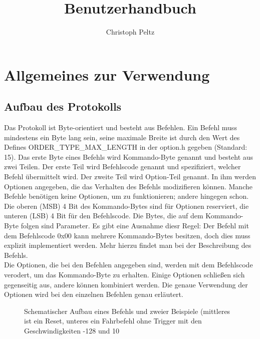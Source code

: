 \documentclass[a4paper]{article}
\title{Benutzerhandbuch}
\author{Christoph Peltz}
\begin{document}
\maketitle
\pagebreak
\tableofcontents
\pagebreak
	\section{Allgemeines zur Verwendung}


	\subsection{Aufbau des Protokolls}

	Das Protokoll ist Byte-orientiert und besteht aus Befehlen.
	Ein Befehl muss mindestens ein Byte lang sein, seine
	maximale Breite ist durch den Wert des Defines
	ORDER\_TYPE\_MAX\_LENGTH in der option.h gegeben (Standard: 15).
	Das erste Byte eines Befehls wird Kommando-Byte genannt und
	besteht aus zwei Teilen. Der erste Teil wird Befehlscode
	genannt und spezifiziert, welcher Befehl übermittelt wird.
	Der zweite Teil wird Option-Teil genannt. In ihm werden
	Optionen angegeben, die das Verhalten des Befehls modizifieren
	können. Manche Befehle benötigen keine Optionen, um zu
	funktionieren; andere hingegen schon. Die oberen (MSB) 4 Bit
	des Kommando-Bytes sind für Optionen reserviert, die unteren
	(LSB) 4 Bit für den Befehlscode. Die Bytes, die auf dem
	Kommando-Byte folgen sind Parameter. Es gibt eine Ausnahme
	diesr Regel: Der Befehl mit dem Befehlscode 0x00 kann mehrere
	Kommando-Bytes besitzen, doch dies muss explizit implementiert
	werden. Mehr hierzu findet man bei der Beschreibung des Befehls.
	\\
	Die Optionen, die bei den Befehlen angegeben sind, werden mit
	dem Befehlscode verodert, um das Kommando-Byte zu erhalten.
	Einige Optionen schließen sich gegenseitig aus, andere können
	kombiniert werden. Die genaue Verwendung der Optionen wird
	bei den einzelnen Befehlen genau erläutert.
	\\
	\begin{figure}[!ht]
		\centering
		\caption{Schematischer Aufbau eines Befehls und zweier Beispiele (mittleres ist ein Reset, unteres ein Fahrbefehl ohne
		Trigger mit den Geschwindigkeiten -128 und 10}
	\end{figure}
	
\end{document}
